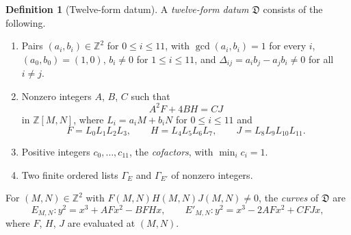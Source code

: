 \documentclass[12pt,oneside,openany]{book}
\theoremstyle{definition}
\theoremstyle{plain}
\numberwithin{equation}{chapter}
\theoremstyle{plain}
\theoremstyle{definition}
\newtheorem{definition}[definition]{Definition}
\theoremstyle{remark}
\newcommand{\Z}{\mathbb Z}
\newcommand{\datum}{\mathfrak D}
\begin{document}
\begin{definition}[Twelve-form datum]\label{def:datum}
A \emph{twelve-form datum} $\datum$ consists of the following.
\begin{enumerate}[label=(\alph*),ref=(\alph*)]
\item\label{item:datum-forms} Pairs $(a_i,b_i)\in\Z^2$ for $0\le i\le11$, with $\gcd(a_i,b_i)=1$ for every $i$, $(a_0,b_0)=(1,0)$, $b_i\ne0$ for $1\le i\le11$, and $\Delta_{ij}=a_ib_j-a_jb_i\ne0$ for all $i\ne j$.
\item\label{item:datum-identity} Nonzero integers $A$, $B$, $C$ such that
\begin{equation}\label{eq:datum-identity}
A^2F+4BH=CJ
\end{equation}
in $\Z[M,N]$, where $L_i=a_iM+b_iN$ for $0\le i\le11$ and
\begin{equation}\label{eq:FHJ}
F=L_0L_1L_2L_3,\qquad H=L_4L_5L_6L_7,\qquad J=L_8L_9L_{10}L_{11}.
\end{equation}
\item\label{item:datum-cofactors} Positive integers $c_0,\dots,c_{11}$, the \emph{cofactors}, with $\min_ic_i=1$.
\item\label{item:datum-constants} Two finite ordered lists $\Gamma_E$ and $\Gamma_{E'}$ of nonzero integers.
\end{enumerate}
For $(M,N)\in\Z^2$ with $F(M,N)H(M,N)J(M,N)\ne0$, the \emph{curves} of $\datum$ are
\begin{equation}\label{eq:family-curves}
E_{M,N}\colon y^2=x^3+AFx^2-BFHx,\qquad E'_{M,N}\colon y^2=x^3-2AFx^2+CFJx,
\end{equation}
where $F$, $H$, $J$ are evaluated at $(M,N)$.
\end{definition}
\end{document}

